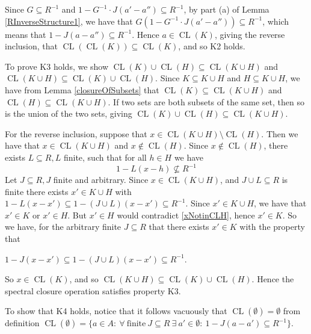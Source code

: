 \documentclass[12pt, oneside]{book}
\def\CL{\operatorname{CL}}
\begin{document}
\noindent Since $G \subseteq R^{-1}$ and $1-G^{-1} \cdot J (a'-a'') \subseteq R^{-1}$, by part (a) of
Lemma \ref{RInverseStructure1}, we have that $G(1-G^{-1} \cdot J(a'-a'')) \subseteq R^{-1}$, 
which means that $1-J(a-a'') \subseteq R^{-1}$. Hence $a \in \CL(K)$, giving the 
reverse inclusion, that $\CL(\CL(K)) \subseteq \CL(K)$, and so K2 holds.

\vskip 0.3cm

\noindent To prove K3 holds, we show 
$\CL(K) \cup \CL(H)\subseteq \CL(K \cup H)$ and $\CL(K \cup H) \subseteq \CL(K) \cup \CL(H)$.
\vskip 0.3cm
\noindent Since $K \subseteq K \cup H$ and $H \subseteq K \cup H$, we have from 
Lemma \ref{closureOfSubsets} that $\CL(K) \subseteq \CL(K \cup H)$ and $\CL(H) \subseteq \CL(K \cup H)$. 
If two sets are both subsets of the same set, then so is the union of the two sets, 
giving $\CL(K) \cup \CL(H) \subseteq \CL(K \cup H)$.

\vskip 0.3cm

\noindent For the reverse inclusion, suppose that  $x \in \CL(K \cup H)\setminus \CL(H)$. 
Then we have that $x \in \CL(K \cup H)$ and $x \not \in \CL(H)$. Since $x \not \in \CL(H)$, there exists 
$L \subseteq R, L$ finite, such that for all $h \in H$ we have 
\begin{equation} \label{xNotinCLH}
1-L(x-h) \not \subseteq R^{-1} 
\end{equation}
Let $J \subseteq R, J$ finite and arbitrary. 
Since $x \in \CL(K \cup H)$, and $J \cup L \subseteq R$ is finite there exists $x' \in K \cup H$ 
with $1-L(x-x') \subseteq  1 - (J \cup L) (x-x') \subseteq R^{-1}$. Since  $x' \in K \cup H$, 
we have that $x' \in K$ or $x' \in H$. 
But $x' \in H$ would contradict \eqref{xNotinCLH}, hence $x' \in K$. 
So we have, for the arbitrary finite $J \subseteq R$ that there exists $x' \in K$ with the property that
\begin{center}
$1 - J(x - x') \subseteq 1 - (J \cup L)(x - x') \subseteq R^{-1}$.
\end{center}  

\noindent So $x \in \CL(K)$, and so $\CL(K \cup H) \subseteq \CL(K) \cup \CL(H)$. Hence the spectral closure operation satisfies property K3.
\vskip 0.3cm

\noindent To show that K4 holds, notice that  it follows vacuously that $\CL(\emptyset)=\emptyset$ 
from definition $\CL(\emptyset)=\{ a \in A:\ \forall\ \text{finite}\ J \subseteq R\ \exists\ a' \in \emptyset:\ 1-J(a-a') \subseteq R^{-1} \}$.

\vskip 0.3cm
\end{document}
